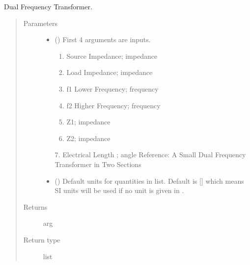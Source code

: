 \documentclass[letterpaper,10pt,english]{sphinxmanual}
\begin{document}
\begin{fulllineitems}
\label{\detokenize{components:components.DualFrequencyTransformer}}
Dual Frequency Transformer.
\begin{quote}\begin{description}
\item[{Parameters}] \leavevmode\begin{itemize}
\item {} 
 () \textendash{} 
First 4 arguments are inputs.
\begin{enumerate}
%
\item {} 
Source Impedance; impedance

\item {} 
Load Impedance; impedance

\item {} 
f1 Lower Frequency; frequency

\item {} 
f2 Higher Frequency; frequency

\item {} 
Z1; impedance

\item {} 
Z2; impedance

\end{enumerate}

7. Electrical Length ; angle
Reference:  A Small Dual Frequency Transformer in Two Sections


\item {} 
 (\sphinxstyleliteralemphasis{\sphinxupquote{, }}) \textendash{} Default units for quantities in  list. Default is {[}{]} which means SI units will be used if no unit is given in .

\end{itemize}

\item[{Returns}] \leavevmode
arg

\item[{Return type}] \leavevmode
list

\end{description}\end{quote}

\end{fulllineitems}
\end{document}
